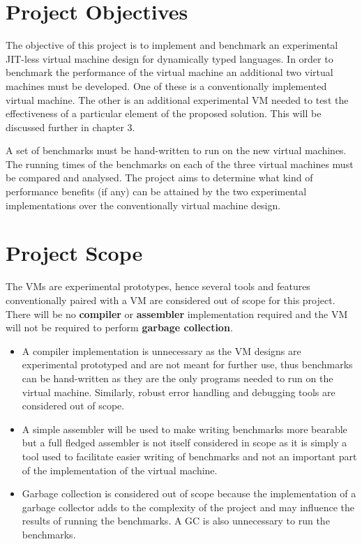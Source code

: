 \documentclass[english,a4paper,12pt]{report}
\begin{document}
\section{Project Objectives}
The objective of this project is to implement and benchmark an
experimental JIT-less virtual machine design for dynamically typed
languages. In order to benchmark the performance of the virtual
machine an additional two virtual machines must be developed. One of
these is a conventionally implemented virtual machine. The other is an
additional experimental VM needed to test the effectiveness of a
particular element of the proposed solution. This will be discussed
further in chapter 3.

A set of benchmarks must be hand-written to run on the new virtual
machines. The running times of the benchmarks on each of the three
virtual machines must be compared and analysed. The project aims to
determine what kind of performance benefits (if any) can be attained
by the two experimental implementations over the conventionally
virtual machine design.

\section{Project Scope}

The VMs are experimental prototypes, hence several tools and features
conventionally paired with a VM are considered out of scope for this
project. There will be no \textbf{compiler} or \textbf{assembler}
implementation required and the VM will not be required to perform
\textbf{garbage collection}.

\begin{itemize}
\item A compiler implementation is unnecessary as the VM designs are
  experimental prototyped and are not meant for further use, thus
  benchmarks can be hand-written as they are the only programs needed
  to run on the virtual machine. Similarly, robust error handling and
  debugging tools are considered out of scope.
	
\item A simple assembler will be used to make writing benchmarks more
  bearable but a full fledged assembler is not itself considered in
  scope as it is simply a tool used to facilitate easier writing of
  benchmarks and not an important part of the implementation of the
  virtual machine.
	
\item Garbage collection is considered out of scope because the
  implementation of a garbage collector adds to the complexity of the
  project and may influence the results of running the benchmarks. A
  GC is also unnecessary to run the benchmarks.
\end{itemize}
\end{document}
